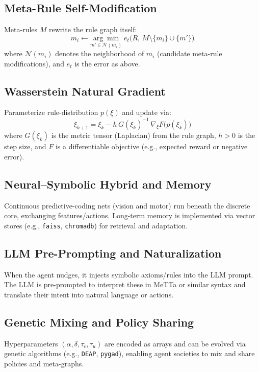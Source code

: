 \documentclass[11pt]{article}
\begin{document}
\subsection{Meta-Rule Self-Modification}
Meta-rules $M$ rewrite the rule graph itself:
\[
  m_i \leftarrow \underset{m'\in\mathcal{N}(m_i)}{\arg\min}\;e_t\bigl(R,\,M\setminus\{m_i\}\cup\{m'\}\bigr)
\]
where $\mathcal{N}(m_i)$ denotes the neighborhood of $m_i$ (candidate meta-rule modifications), and $e_t$ is the error as above.

\subsection{Wasserstein Natural Gradient}
Parameterize rule-distribution $p(\xi)$ and update via:
\[
  \xi_{k+1} = \xi_k - h\,G(\xi_k)^{-1}\,\nabla_{\xi}F\bigl(p(\xi_k)\bigr)
\]
where $G(\xi_k)$ is the metric tensor (Laplacian) from the rule graph, $h>0$ is the step size, and $F$ is a differentiable objective (e.g., expected reward or negative error).

\subsection{Neural–Symbolic Hybrid and Memory}
Continuous predictive-coding nets (vision and motor) run beneath the discrete core, exchanging features/actions. Long-term memory is implemented via vector stores (e.g., \texttt{faiss}, \texttt{chromadb}) for retrieval and adaptation.

\subsection{LLM Pre-Prompting and Naturalization}
When the agent nudges, it injects symbolic axioms/rules into the LLM prompt. The LLM is pre-prompted to interpret these in MeTTa or similar syntax and translate their intent into natural language or actions.

\subsection{Genetic Mixing and Policy Sharing}
Hyperparameters $(\alpha,\delta,\tau_c,\tau_u)$ are encoded as arrays and can be evolved via genetic algorithms (e.g., \texttt{DEAP}, \texttt{pygad}), enabling agent societies to mix and share policies and meta-graphs.
\end{document}
